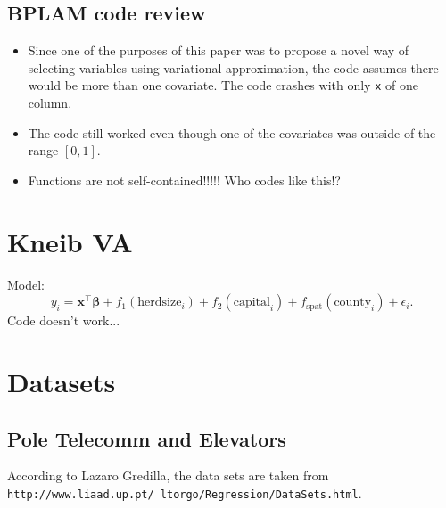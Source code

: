 \documentclass[11pt]{article}
\newcommand{\bs}{\boldsymbol}
\begin{document}
\subsection{BPLAM code review}
  \begin{itemize}
  \item Since one of the purposes of this paper was to propose a novel way of selecting variables using variational approximation, the code assumes there would be more than one covariate. The code crashes with only \texttt{x} of one column.
  \item The code still worked even though one of the covariates was outside of the range $\left[0,1\right]$.\\
  \item Functions are not self-contained!!!!! Who codes like this!?
  \end{itemize}
\section{Kneib VA}
Model:
\begin{equation}
  y_{i} = \mathbf{x}^{\top}\bs{\beta}+f_{1}\left(\text{herdsize}_{i}\right)+f_{2}\left(\text{capital}_{i}\right)+f_{\text{spat}}\left(\text{county}_{i}\right) + \epsilon_{i}.
\end{equation}
Code doesn't work...
\section{Datasets}
\subsection{Pole Telecomm and Elevators}
  According to Lazaro Gredilla, the data sets are taken from \texttt{http://www.liaad.up.pt/~ltorgo/Regression/DataSets.html}. 
\end{document}
